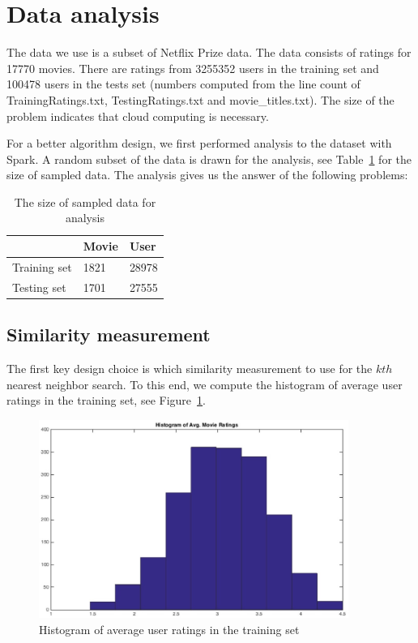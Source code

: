 \section{Data analysis}
The data we use is a subset of Netflix Prize data. The data consists
of ratings for 17770 movies. There are ratings from 3255352 users in
the training set and 100478 users in the tests set (numbers computed
from the line count of TrainingRatings.txt, TestingRatings.txt and
movie\_titles.txt). The size of the problem indicates that cloud
computing is necessary.

For a better algorithm design, we first performed analysis to the
dataset with Spark. A random subset of the data is drawn for the
analysis, see Table~\ref{tab:subsample} for the size of sampled
data. The analysis gives us the answer of the following problems:

\begin{table}
  \centering
  \begin{tabular}{| p{5cm} | p{3cm} | p{3cm} |}
      \hline
       & Movie & User \\
      \hline
      Training set & 1821 & 28978\\
      \hline
      Testing set & 1701 & 27555\\
      \hline
  \end{tabular}
  \caption{The size of sampled data for analysis}
  \label{tab:subsample}
\end{table}

\subsection*{Similarity measurement}
The first key design choice is which similarity measurement to use for
the $kth$ nearest neighbor search. To this end, we compute the
histogram of average user ratings in the training set, see
Figure~\ref{fig:hist}.
\begin{figure}[!ht]
  \centering
  \includegraphics[width=0.9\textwidth]{images/hist}
  \caption{Histogram of average user ratings in the training set}
  \label{fig:hist}
\end{figure}

